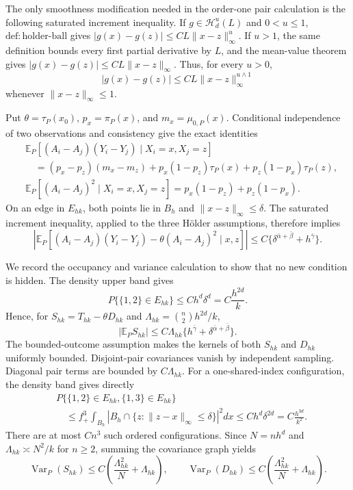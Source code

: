 The only smoothness modification needed in the order-one pair calculation is the following saturated increment inequality.  If \(g\in\mathcal H_d^u(L)\) and \(0<u\leq1\), \(\mathrm{def:holder\mbox{-}ball}\) gives \(|g(x)-g(z)|\leq C L\|x-z\|_\infty^u\).  If \(u>1\), the same definition bounds every first partial derivative by \(L\), and the mean-value theorem gives \(|g(x)-g(z)|\leq C L\|x-z\|_\infty\).  Thus, for every \(u>0\),
\[
 |g(x)-g(z)|\leq CL\|x-z\|_\infty^{u\wedge1}
\]
whenever \(\|x-z\|_\infty\leq1\).

Put \(\theta=\tau_P(x_0)\), \(p_x=\pi_P(x)\), and \(m_x=\mu_{0,P}(x)\).  Conditional independence of two observations and consistency give the exact identities
\[
 \begin{aligned}
 &\mathbb E_P[(A_i-A_j)(Y_i-Y_j)\mid X_i=x,X_j=z]\\
 &\quad=(p_x-p_z)(m_x-m_z)+p_x(1-p_z)\tau_P(x)+p_z(1-p_x)\tau_P(z),\\
 &\mathbb E_P[(A_i-A_j)^2\mid X_i=x,X_j=z]
 =p_x(1-p_z)+p_z(1-p_x).
 \end{aligned}
\]
On an edge in \(E_{hk}\), both points lie in \(B_h\) and \(\|x-z\|_\infty\leq\delta\).  The saturated increment inequality, applied to the three H\"older assumptions, therefore implies
\[
 \left|\mathbb E_P\left[(A_i-A_j)(Y_i-Y_j)-\theta(A_i-A_j)^2\mid x,z\right]\right|
 \leq C\{\delta^{\bar\alpha+\bar\beta}+h^{\bar\gamma}\}.
\]

We record the occupancy and variance calculation to show that no new condition is hidden.  The density upper band gives
\[
 P\{\{1,2\}\in E_{hk}\}\leq C h^d\delta^d=C\frac{h^{2d}}{k}.
\]
Hence, for \(S_{hk}=T_{hk}-\theta D_{hk}\) and \(\Lambda_{hk}=\binom n2h^{2d}/k\),
\[
 |\mathbb E_PS_{hk}|\leq C\Lambda_{hk}
 \{h^{\bar\gamma}+\delta^{\bar\alpha+\bar\beta}\}.
\]
The bounded-outcome assumption makes the kernels of both \(S_{hk}\) and \(D_{hk}\) uniformly bounded.  Disjoint-pair covariances vanish by independent sampling.  Diagonal pair terms are bounded by \(C\Lambda_{hk}\).  For a one-shared-index configuration, the density band gives directly
\[
 \begin{aligned}
 &P\{\{1,2\}\in E_{hk},\{1,3\}\in E_{hk}\}\\
 &\quad\leq f_+^3\int_{B_h}
 \left|B_h\cap\{z:\|z-x\|_\infty\leq\delta\}\right|^2dx
 \leq C h^d\delta^{2d}=C\frac{h^{3d}}{k^2}.
 \end{aligned}
\]
There are at most \(Cn^3\) such ordered configurations.  Since \(N=nh^d\) and \(\Lambda_{hk}\asymp N^2/k\) for \(n\geq2\), summing the covariance graph yields
\[
 \operatorname{Var}_P(S_{hk})\leq C\left(\frac{\Lambda_{hk}^2}{N}+\Lambda_{hk}\right),
 \qquad
 \operatorname{Var}_P(D_{hk})\leq C\left(\frac{\Lambda_{hk}^2}{N}+\Lambda_{hk}\right).
\]

